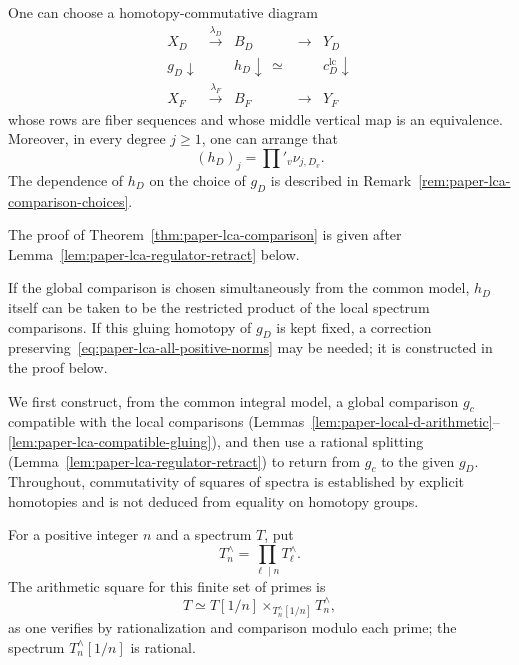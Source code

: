 \begin{theorem}
\label{thm:paper-lca-comparison}
One can choose a homotopy-commutative diagram
\begin{equation}\label{eq:paper-lca-comparison-square}
\begin{array}{ccccc}
 X_D&\xrightarrow{\lambda_D}&B_D&\longrightarrow&Y_D\\
 {\scriptstyle g_D}\downarrow&&
 {\scriptstyle h_D}\downarrow\,\simeq&&{\scriptstyle c^{\mathrm{lc}}_D}\downarrow\\
 X_F&\xrightarrow{\lambda_F}&B_F&\longrightarrow&Y_F
\end{array}
\end{equation}
whose rows are fiber sequences and whose middle vertical map is an equivalence.
Moreover, in every degree $j\ge1$, one can arrange that
\begin{equation}\label{eq:paper-lca-all-positive-norms}
 (h_D)_j=\prod'_v\nu_{j,D_v}.
\end{equation}
The dependence of $h_D$ on the choice of $g_D$ is described in Remark~\ref{rem:paper-lca-comparison-choices}.
\end{theorem}
The proof of Theorem~\ref{thm:paper-lca-comparison} is given after Lemma~\ref{lem:paper-lca-regulator-retract} below.

\begin{remark}\label{rem:paper-lca-comparison-choices}
If the global comparison is chosen simultaneously from the common model, $h_D$ itself can be taken to be the restricted product of the local spectrum comparisons.
If this gluing homotopy of $g_D$ is kept fixed, a correction preserving~\eqref{eq:paper-lca-all-positive-norms} may be needed; it is constructed in the proof below.
\end{remark}

We first construct, from the common integral model, a global comparison $g_c$ compatible with the local comparisons (Lemmas~\ref{lem:paper-local-d-arithmetic}--\ref{lem:paper-lca-compatible-gluing}), and then use a rational splitting (Lemma~\ref{lem:paper-lca-regulator-retract}) to return from $g_c$ to the given $g_D$.
Throughout, commutativity of squares of spectra is established by explicit homotopies and is not deduced from equality on homotopy groups.

For a positive integer $n$ and a spectrum $T$, put
\[
 T^\wedge_n=\prod_{\ell\mid n}T^\wedge_\ell.
\]
The arithmetic square for this finite set of primes is
\begin{equation}\label{eq:paper-finite-d-arithmetic}
 T\simeq T[1/n]\mathop{\times}_{T^\wedge_n[1/n]}T^\wedge_n,
\end{equation}
as one verifies by rationalization and comparison modulo each prime; the spectrum $T^\wedge_n[1/n]$ is rational.

